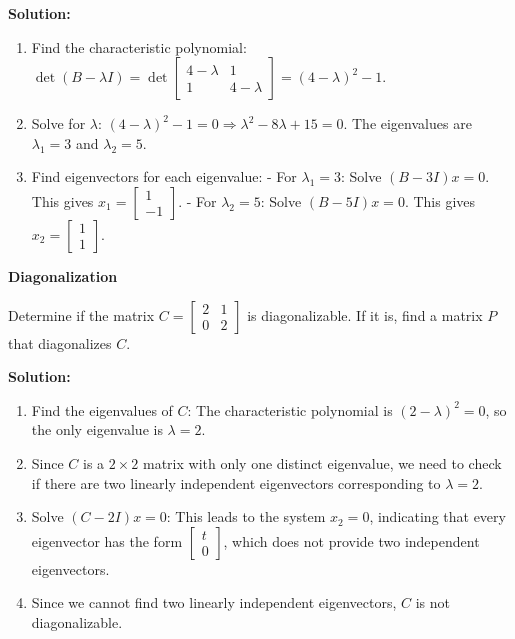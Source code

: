 \documentclass[8pt, a4paper, landscape]{extarticle}
\begin{document}
\begin{multicols*}{5}
  \textbf{Solution:}
  \begin{enumerate}
    \item Find the characteristic polynomial: $\det(B - \lambda I) = \det \begin{bmatrix} 4-\lambda & 1 \\ 1 & 4-\lambda \end{bmatrix} = (4-\lambda)^2 - 1$.
    \item Solve for $\lambda$: $(4-\lambda)^2 - 1 = 0 \Rightarrow \lambda^2 - 8\lambda + 15 = 0$. The eigenvalues are $\lambda_1 = 3$ and $\lambda_2 = 5$.
    \item Find eigenvectors for each eigenvalue:
          - For $\lambda_1 = 3$: Solve $(B - 3I)x = 0$. This gives $x_1 = \begin{bmatrix} 1 \\ -1 \end{bmatrix}$.
          - For $\lambda_2 = 5$: Solve $(B - 5I)x = 0$. This gives $x_2 = \begin{bmatrix} 1 \\ 1 \end{bmatrix}$.
  \end{enumerate}

  \textbf{Diagonalization}

  Determine if the matrix $C = \begin{bmatrix} 2 & 1 \\ 0 & 2 \end{bmatrix}$ is diagonalizable. If it is, find a matrix $P$ that diagonalizes $C$.

  \textbf{Solution:}
  \begin{enumerate}
    \item Find the eigenvalues of $C$: The characteristic polynomial is $(2 - \lambda)^2 = 0$, so the only eigenvalue is $\lambda = 2$.
    \item Since $C$ is a $2 \times 2$ matrix with only one distinct eigenvalue, we need to check if there are two linearly independent eigenvectors corresponding to $\lambda = 2$.
    \item Solve $(C - 2I)x = 0$: This leads to the system $x_2 = 0$, indicating that every eigenvector has the form $\begin{bmatrix} t \\ 0 \end{bmatrix}$, which does not provide two independent eigenvectors.
    \item Since we cannot find two linearly independent eigenvectors, $C$ is not diagonalizable.
  \end{enumerate}


\end{multicols*}
\end{document}
